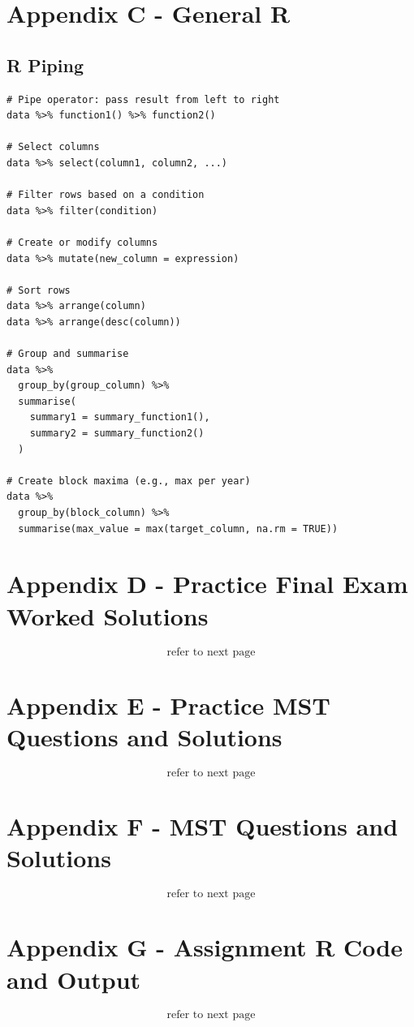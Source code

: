 \documentclass[11pt]{article}
\begin{document}
\newpage 

\section{Appendix C - General R}
\subsection{R Piping}
\begin{lstlisting}
# Pipe operator: pass result from left to right
data %>% function1() %>% function2()

# Select columns
data %>% select(column1, column2, ...)

# Filter rows based on a condition
data %>% filter(condition)

# Create or modify columns
data %>% mutate(new_column = expression)

# Sort rows
data %>% arrange(column)
data %>% arrange(desc(column))

# Group and summarise
data %>%
  group_by(group_column) %>%
  summarise(
    summary1 = summary_function1(),
    summary2 = summary_function2()
  )

# Create block maxima (e.g., max per year)
data %>%
  group_by(block_column) %>%
  summarise(max_value = max(target_column, na.rm = TRUE))
\end{lstlisting}
\newpage

\section{Appendix D - Practice Final Exam Worked Solutions}
$$\text{refer to next page}$$


\section{Appendix E - Practice MST Questions and Solutions}
$$\text{refer to next page}$$


\section{Appendix F - MST Questions and Solutions}
$$\text{refer to next page}$$


\section{Appendix G - Assignment R Code and Output}
$$\text{refer to next page}$$

\end{document}
